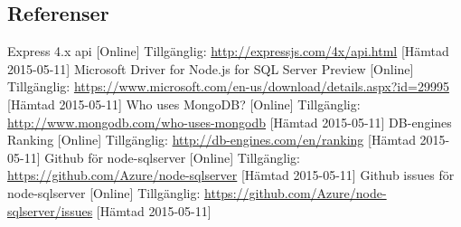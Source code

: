\subsection{Referenser}
\vspace{-9mm}
\begin{thebibliography}{9}
Express 4.x api [Online] Tillgänglig: 
\url{http://expressjs.com/4x/api.html} [Hämtad 2015-05-11]
Microsoft Driver for Node.js for SQL Server Preview [Online] Tillgänglig: 
\url{https://www.microsoft.com/en-us/download/details.aspx?id=29995} [Hämtad 2015-05-11]
Who uses MongoDB? [Online] Tillgänglig: 
\url{http://www.mongodb.com/who-uses-mongodb} [Hämtad 2015-05-11]
DB-engines Ranking [Online] Tillgänglig: 
\url{http://db-engines.com/en/ranking} [Hämtad 2015-05-11]
Github för node-sqlserver [Online] Tillgänglig:  
\url{https://github.com/Azure/node-sqlserver} [Hämtad 2015-05-11]
Github issues för node-sqlserver [Online] Tillgänglig: 
\url{https://github.com/Azure/node-sqlserver/issues} [Hämtad 2015-05-11]
\end{thebibliography}
